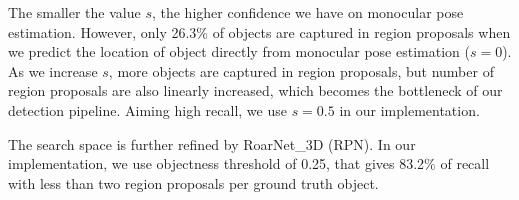 \documentclass[letterpaper, 10 pt, conference]{ieeeconf}
\begin{document}
The smaller the value $s$, the higher confidence we have on monocular pose estimation. However, only 26.3\% of objects are captured in region proposals when we predict the location of object directly from monocular pose estimation ($s=0$). As we increase $s$, more objects are captured in region proposals, but number of region proposals are also linearly increased, which becomes the bottleneck of our detection pipeline. Aiming high recall, we use $s=0.5$ in our implementation.

The search space is further refined by RoarNet\_3D (RPN). In our implementation, we use objectness threshold of 0.25, that gives 83.2\% of recall with less than two region proposals per ground truth object.


\begin{figure}[h]
    \centering
    \setlength\figureheight{4cm}
\end{figure}
\end{document}
